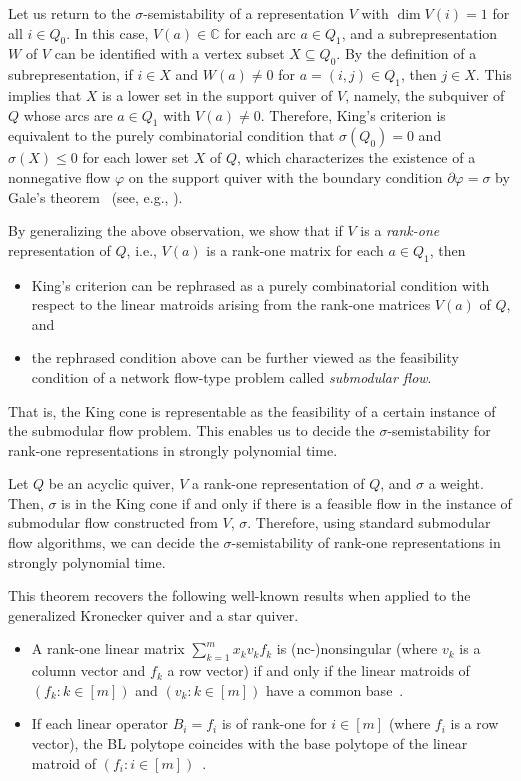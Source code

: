 \documentclass[a4paper,11pt]{article}
\numberwithin{equation}{section}
\newcommand{\C}{\mathbb{C}}
\begin{document}
Let us return to the $\sigma$-semistability of a representation $V$ with $\dim V(i) = 1$ for all $i \in Q_0$.
In this case, $V(a) \in \C$ for each arc $a \in Q_1$,
and a subrepresentation $W$ of $V$ can be identified with a vertex subset $X \subseteq Q_0$.
By the definition of a subrepresentation, if $i \in X$ and $W(a) \neq 0$ for $a = (i, j) \in Q_1$, then $j \in X$. 
This implies that $X$ is a lower set in the support quiver of $V$, namely, the subquiver of $Q$ whose arcs are $a \in Q_1$ with $V(a) \neq 0$.
Therefore, King's criterion is equivalent to the purely combinatorial condition that $\sigma(Q_0) = 0$ and $\sigma(X) \leq 0$ for each lower set $X$ of $Q$,
which characterizes the existence of a nonnegative flow $\varphi$ on the support quiver with the boundary condition $\partial \varphi = \sigma$
by Gale's theorem~\cite{Gale1957} (see, e.g., \cite[Theorem~9.2]{KorteVygen2018}).

By generalizing the above observation, we show that if $V$ is a \emph{rank-one} representation of $Q$, i.e., $V(a)$ is a rank-one matrix for each $a \in Q_1$,
then
\begin{itemize}
    \item King's criterion can be rephrased as a purely combinatorial condition with respect to the linear matroids arising from the rank-one matrices $V(a)$ of $Q$, and
    \item the rephrased condition above can be further viewed as the feasibility condition of a network flow-type problem called \emph{submodular flow}.
\end{itemize}
That is,
the King cone is representable as the feasibility of a certain instance of the submodular flow problem.
This enables us to decide the $\sigma$-semistability for rank-one representations in strongly polynomial time.

\begin{theorem}\label{thm:intro:rank-one}
Let $Q$ be an acyclic quiver, $V$ a rank-one representation of $Q$, and $\sigma$ a weight.
Then, $\sigma$ is in the King cone if and only if there is a feasible flow in the instance of submodular flow constructed from $V$, $\sigma$. Therefore, using standard submodular flow algorithms, we can decide the $\sigma$-semistability of rank-one representations in strongly polynomial time.
\end{theorem}

This theorem recovers the following well-known results when applied to the generalized Kronecker quiver and a star quiver.
\begin{itemize}
    \item A rank-one linear matrix $\sum_{k=1}^m x_k v_k f_k$ is (nc-)nonsingular (where $v_k$ is a column vector and $f_k$ a row vector) if and only if the linear matroids of $(f_k : k \in [m])$ and $(v_k : k \in [m])$ have a common base~\citep{Lovasz1989}.
    \item If each linear operator $B_i = f_i$ is of rank-one for $i \in [m]$ (where $f_i$ is a row vector), the BL polytope coincides with the base polytope of the linear matroid of $(f_i : i \in [m])$~\citep{Barthe1998}.
\end{itemize}
\end{document}
